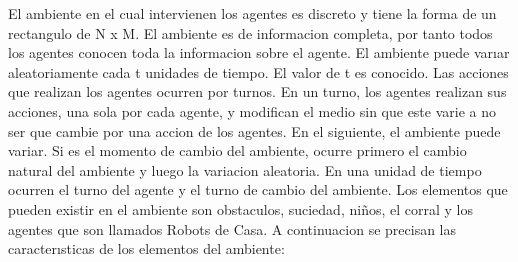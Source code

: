 \documentclass[a4paper,10pt,twocolumn]{article}
\begin{document}
El ambiente en el cual intervienen los agentes es discreto y tiene la forma de un rectangulo de N x M. El ambiente es de informacion completa, por tanto todos los agentes conocen toda la informacion sobre el agente. El ambiente puede varıar aleatoriamente cada t unidades de tiempo. El valor de t es conocido. Las acciones que realizan los agentes ocurren por turnos. En un turno, los agentes realizan sus acciones, una sola por cada agente, y modifican el medio sin que este varie a no ser que cambie por una accion de los agentes. En el siguiente, el ambiente puede variar. Si es el momento de cambio del ambiente, ocurre primero el cambio natural del ambiente y luego la variacion aleatoria. En una unidad de tiempo ocurren el turno del agente y el turno de cambio del ambiente. Los elementos que pueden existir en el ambiente son obstaculos, suciedad, ni\~nos, el corral y los agentes que son llamados Robots de Casa. A continuacion se precisan las caracterısticas de los elementos del ambiente:
\end{document}
